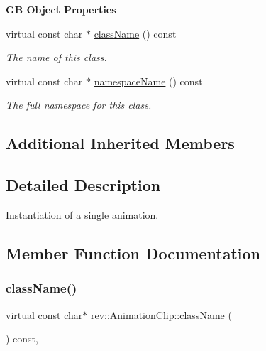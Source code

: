 \begin{Indent}\textbf{ GB Object Properties}\par
\begin{DoxyCompactItemize}
\item 
virtual const char $\ast$ \mbox{\hyperlink{classrev_1_1_animation_clip_a9bc0588a19cccdc1bc70ce7e58cb7ccd}{class\+Name}} () const
\begin{DoxyCompactList}\small\item\em The name of this class. \end{DoxyCompactList}\item 
virtual const char $\ast$ \mbox{\hyperlink{classrev_1_1_animation_clip_aa6b49559406127733a258a373ce49694}{namespace\+Name}} () const
\begin{DoxyCompactList}\small\item\em The full namespace for this class. \end{DoxyCompactList}\end{DoxyCompactItemize}
\end{Indent}
\subsection*{Additional Inherited Members}


\subsection{Detailed Description}
Instantiation of a single animation. 

\subsection{Member Function Documentation}
\mbox{\label{classrev_1_1_animation_clip_a9bc0588a19cccdc1bc70ce7e58cb7ccd}} 
\subsubsection{\texorpdfstring{className()}{className()}}
{\footnotesize\ttfamily virtual const char$\ast$ rev\+::\+Animation\+Clip\+::class\+Name (\begin{DoxyParamCaption}{ }\end{DoxyParamCaption}) const\hspace{0.3cm}{\ttfamily [inline]}, {\ttfamily [virtual]}}



